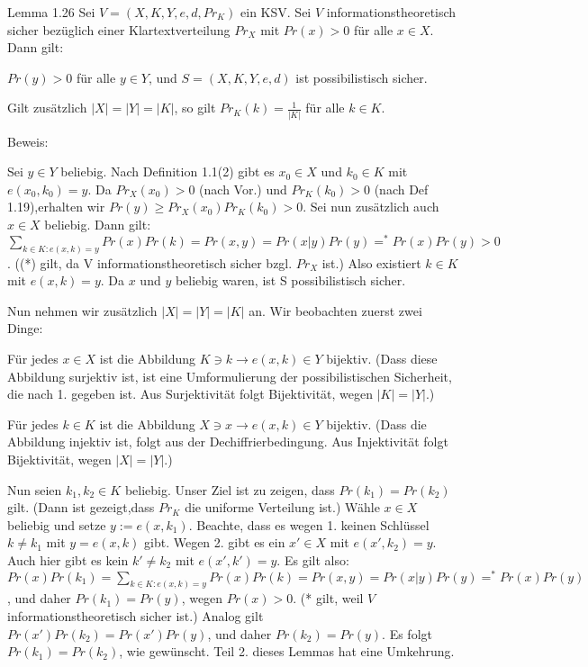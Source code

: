 \documentclass[a4paper]{article}
\begin{document}
\begin{multicols}{3}
    Lemma 1.26 Sei $V=(X,K,Y,e,d,Pr_K)$ ein KSV. Sei $V$ informationstheoretisch sicher bezüglich einer Klartextverteilung $Pr_X$ mit $Pr(x)>0$ für alle $x\in X$. Dann gilt:
    \begin{enumerate*}
        \item $Pr(y)>0$ für alle $y\in Y$, und $S=(X,K,Y,e,d)$ ist possibilistisch sicher.
        \item Gilt zusätzlich $|X|=|Y|=|K|$, so gilt $Pr_K(k)=\frac{1}{|K|}$ für alle $k\in K$.
    \end{enumerate*}

    Beweis:
    \begin{enumerate*}
        \item Sei $y\in Y$ beliebig. Nach Definition 1.1(2) gibt es $x_0\in X$ und $k_0\in K$ mit $e(x_0,k_0)=y$. Da $Pr_X(x_0)>0$ (nach Vor.) und $Pr_K(k_0)>0$ (nach Def 1.19),erhalten wir $Pr(y)\geq Pr_X(x_0)Pr_K(k_0)>0$. Sei nun zusätzlich auch $x\in X$ beliebig. Dann gilt: $\sum_{k\in K:e(x,k)=y} Pr(x)Pr(k)= Pr(x,y)= Pr(x|y)Pr(y)=^* Pr(x)Pr(y)> 0$. ((*) gilt, da V informationstheoretisch sicher bzgl. $Pr_X$ ist.) Also existiert $k\in K$ mit $e(x,k)=y$. Da $x$ und $y$ beliebig waren, ist S possibilistisch sicher.
        \item Nun nehmen wir zusätzlich $|X|=|Y|=|K|$ an. Wir beobachten zuerst zwei Dinge:
        \begin{enumerate*}
            \item Für jedes $x\in X$ ist die Abbildung $K\ni k \rightarrow e(x,k)\in Y$ bijektiv. (Dass diese Abbildung surjektiv ist, ist eine Umformulierung der possibilistischen Sicherheit, die nach 1. gegeben ist. Aus Surjektivität folgt Bijektivität, wegen $|K|=|Y|$.)
            \item Für jedes $k\in K$ ist die Abbildung $X\ni x \rightarrow e(x,k)\in Y$ bijektiv. (Dass die Abbildung injektiv ist, folgt aus der Dechiffrierbedingung. Aus Injektivität folgt Bijektivität, wegen $|X|=|Y|$.)
        \end{enumerate*}
    \end{enumerate*}

    Nun seien $k_1,k_2\in K$ beliebig. Unser Ziel ist zu zeigen, dass $Pr(k_1)=Pr(k_2)$ gilt. (Dann ist gezeigt,dass $Pr_K$ die uniforme Verteilung ist.) Wähle $x\in X$ beliebig und setze $y:=e(x,k_1)$. Beachte, dass es wegen 1. keinen Schlüssel $k\not=k_1$ mit $y=e(x,k)$ gibt. Wegen 2. gibt es ein $x'\in X$ mit $e(x',k_2)=y$. Auch hier gibt es kein $k'\not=k_2$ mit $e(x',k')=y$. Es gilt also: $Pr(x)Pr(k_1)=\sum_{k\in K:e(x,k)=y} Pr(x)Pr(k) = Pr(x,y) = Pr(x|y)Pr(y) =^* Pr(x)Pr(y)$, und daher $Pr(k_1)=Pr(y)$, wegen $Pr(x)>0$. (* gilt, weil $V$ informationstheoretisch sicher ist.) Analog gilt $Pr(x')Pr(k_2)=Pr(x')Pr(y)$, und daher $Pr(k_2)=Pr(y)$. Es folgt $Pr(k_1)=Pr(k_2)$, wie gewünscht.
    Teil 2. dieses Lemmas hat eine Umkehrung.


\end{multicols}
\end{document}
